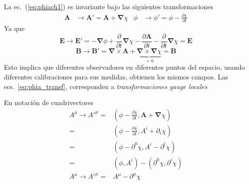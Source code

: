 La ec.~(\ref{eq:phiach1}) es invariante bajo las siguientes transformaciones
\begin{align}
  \label{eq:phia_transf}
  \mathbf{A}&\to\mathbf{A}'=\mathbf{A}+\boldsymbol{\nabla}\chi&
  \phi&\to\phi'=\phi-\frac{\partial\chi}{\partial t} 
\end{align}
Ya que
\begin{equation}
  \label{eq:Etrans}
  \mathbf{E}\to\mathbf{E}'= -\boldsymbol{\nabla}\phi+\frac{\partial}{\partial t}\boldsymbol{\nabla}\chi
  -\frac{\partial\mathbf{A}}{\partial t}-\frac{\partial}{\partial t}\boldsymbol{\nabla}\chi=\mathbf{E}
\end{equation}
\begin{equation}
  \label{eq:btransf}
  \mathbf{B}\to\mathbf{B}'= \boldsymbol{\nabla}\times\mathbf{A}+
  \underbrace{\boldsymbol{\nabla}\times\boldsymbol{\nabla}\chi}_{\displaystyle =0}=\mathbf{B}
\end{equation}
Esto implica que diferentes observadores en diferentes puntos del espacio, usando diferentes calibraciones para sus medidas, obtienen los mismos campos. Las  ecs.~\eqref{eq:phia_transf}, corresponden a \emph{transformaciones gauge locales}

En notación de cuadrivectores
\begin{align}
  A^\mu\to {A'}^\mu=&\left(\phi-\frac{\partial\chi}{\partial t},\mathbf{A}+\boldsymbol{\nabla}\chi
  \right)\nonumber\\
  =&\left(\phi-\frac{\partial\chi}{\partial t},A^{i}+\partial_i\chi
  \right)\nonumber\\
  =&\left(\phi-\partial^0\chi,A^{i}-\partial^{i}\chi
  \right)\nonumber\\
  =&\left(\phi,A^{i}
  \right)-
  \left(
    \partial^0\chi,\partial^{i}\chi
  \right)\nonumber\\
  \label{eq:aphicov}
  A^\mu\to {A'}^\mu=&A^\mu-\partial^\mu\chi
\end{align}




